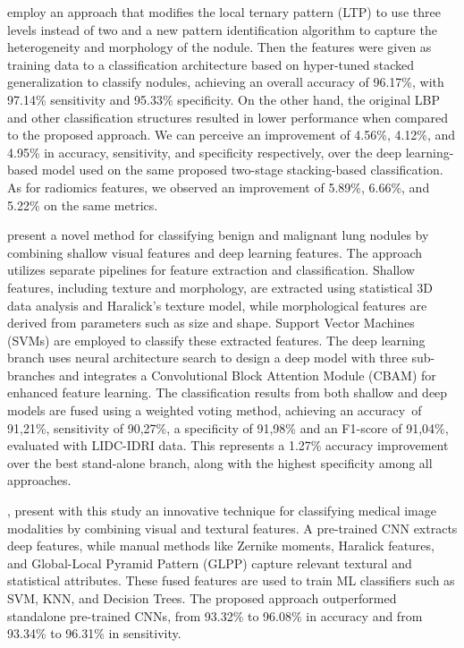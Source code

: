 \citet{Alksas2023} employ an approach that modifies the local ternary pattern (LTP) to use three levels instead of two and a new pattern identification algorithm to capture the heterogeneity and morphology of the nodule. Then the features were given as training data to a classification architecture based on hyper-tuned stacked generalization to classify nodules, achieving an overall accuracy of 96.17\%, with 97.14\% sensitivity and 95.33\% specificity. On the other hand, the original LBP and other classification structures resulted in lower performance when compared to the proposed approach.
We can perceive an improvement of 4.56\%, 4.12\%, and 4.95\% in accuracy, sensitivity, and specificity respectively, over the deep learning-based model used on the same proposed two-stage stacking-based classification. As for radiomics features, we observed an improvement of 5.89\%, 6.66\%, and 5.22\% on the same metrics.

\citet{Liu2023} present a novel method for classifying benign and malignant lung nodules by combining shallow visual features and deep learning features. The approach utilizes separate pipelines for feature extraction and classification. Shallow features, including texture and morphology, are extracted using statistical 3D data analysis and Haralick's texture model, while morphological features are derived from parameters such as size and shape. Support Vector Machines (SVMs) are employed to classify these extracted features. The deep learning branch uses neural architecture search to design a deep model with three sub-branches and integrates a Convolutional Block Attention Module (CBAM) for enhanced feature learning. The classification results from both shallow and deep models are fused using a weighted voting method, achieving an accuracy\ of 91,21\%, sensitivity of 90,27\%, a specificity of 91,98\% and an F1-score of 91,04\%, evaluated with LIDC-IDRI data. This represents a 1.27\% accuracy improvement over the best stand-alone branch, along with the highest specificity among all approaches. 

\citet{Iqbal2023}, present with this study an innovative technique for classifying medical image modalities by combining visual and textural features. A pre-trained CNN extracts deep features, while manual methods like Zernike moments, Haralick features, and Global-Local Pyramid Pattern (GLPP) capture relevant textural and statistical attributes. These fused features are used to train ML classifiers such as SVM, KNN, and Decision Trees. The proposed approach outperformed standalone pre-trained CNNs, from 93.32\% to 96.08\% in accuracy and from 93.34\% to 96.31\% in sensitivity.


